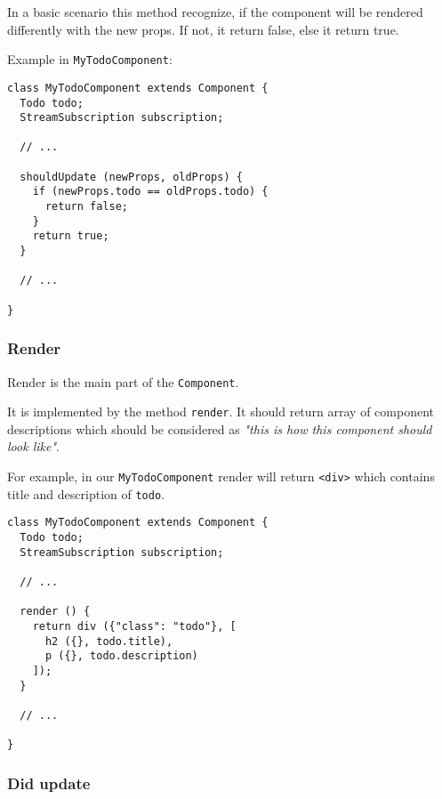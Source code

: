 \documentclass[oneside, 12pt]{book}
\begin{document}
      In a basic scenario this method recognize, 
      if the component will be rendered differently with the new props.  
      If not, it return false, else it return true.

      Example in \texttt{MyTodoComponent}:
      \begin{verbatim}
class MyTodoComponent extends Component {
  Todo todo;
  StreamSubscription subscription;

  // ...

  shouldUpdate (newProps, oldProps) {
    if (newProps.todo == oldProps.todo) {
      return false;
    }
    return true;
  }

  // ...

}
      \end{verbatim}




    \subsubsection{Render}\label{subsec:our-architecture-lifecycle-render}

      Render is the main part of the \texttt{Component}. 

      It is implemented by the method \texttt{render}.
      It should return array of component descriptions which should be considered as 
      \textit{"this is how this component should look like"}.

      For example, in our \texttt{MyTodoComponent} render will return \texttt{<div>} which contains title and description of \texttt{todo}.
      \begin{verbatim}
class MyTodoComponent extends Component {
  Todo todo;
  StreamSubscription subscription;

  // ...

  render () {
    return div ({"class": "todo"}, [
      h2 ({}, todo.title),
      p ({}, todo.description)
    ]);
  }

  // ...

}
      \end{verbatim}




    \subsubsection{Did update}\label{subsec:our-architecture-lifecycle-didupdate}
\end{document}
